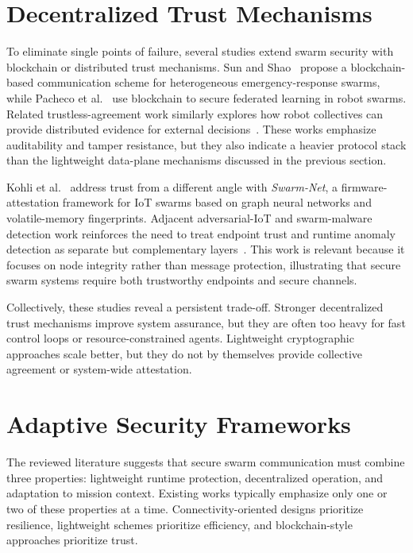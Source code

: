 \section{Decentralized Trust Mechanisms}
\label{sec:decentralized_trust}

To eliminate single points of failure, several studies extend swarm security with blockchain or distributed trust mechanisms. Sun and Shao~\cite{sunResearchDataSecurityEmergency2022} propose a blockchain-based communication scheme for heterogeneous emergency-response swarms, while Pacheco et al.~\cite{pachecoSecuringFederatedLearning2024} use blockchain to secure federated learning in robot swarms. Related trustless-agreement work similarly explores how robot collectives can provide distributed evidence for external decisions~\cite{pachecoSwarmOracleTrustless2025}. These works emphasize auditability and tamper resistance, but they also indicate a heavier protocol stack than the lightweight data-plane mechanisms discussed in the previous section.

Kohli et al.~\cite{kohliSwarmNetFirmwareAttestation2024} address trust from a different angle with \textit{Swarm-Net}, a firmware-attestation framework for IoT swarms based on graph neural networks and volatile-memory fingerprints. Adjacent adversarial-IoT and swarm-malware detection work reinforces the need to treat endpoint trust and runtime anomaly detection as separate but complementary layers~\cite{bommanaAddressingAdversarialAttacks2025,hanifOrchestratingMLSwarmMalware2025}. This work is relevant because it focuses on node integrity rather than message protection, illustrating that secure swarm systems require both trustworthy endpoints and secure channels.

Collectively, these studies reveal a persistent trade-off. Stronger decentralized trust mechanisms improve system assurance, but they are often too heavy for fast control loops or resource-constrained agents. Lightweight cryptographic approaches scale better, but they do not by themselves provide collective agreement or system-wide attestation.

\section{Adaptive Security Frameworks}
\label{sec:adaptive_security}

The reviewed literature suggests that secure swarm communication must combine three properties: lightweight runtime protection, decentralized operation, and adaptation to mission context. Existing works typically emphasize only one or two of these properties at a time. Connectivity-oriented designs prioritize resilience, lightweight schemes prioritize efficiency, and blockchain-style approaches prioritize trust.

